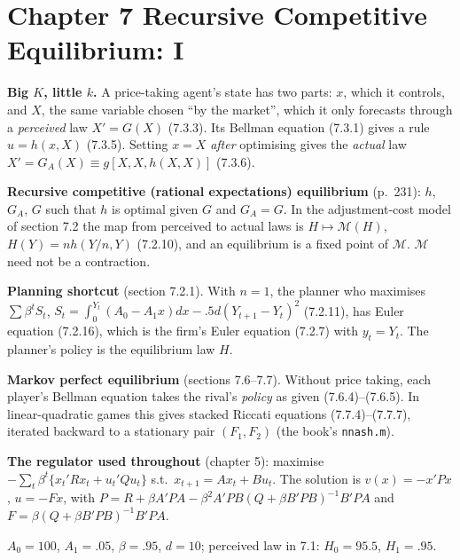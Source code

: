 \documentclass[12pt, letterpaper]{article}
\begin{document}
\tableofcontents
\newpage

\section{Chapter 7 \quad Recursive Competitive Equilibrium: I}

\begin{tcolorbox}[theorybox,title={Chapter 7 Overview}]
\textbf{Big $K$, little $k$.} A price-taking agent's state has two parts: $x$, which it controls,
and $X$, the same variable chosen ``by the market'', which it only forecasts through a
\emph{perceived} law $X'=G(X)$ (7.3.3). Its Bellman equation (7.3.1) gives a rule $u=h(x,X)$
(7.3.5). Setting $x=X$ \emph{after} optimising gives the \emph{actual} law
$X'=G_A(X)\equiv g[X,X,h(X,X)]$ (7.3.6).

\textbf{Recursive competitive (rational expectations) equilibrium} (p.~231): $h$, $G_A$, $G$ such that
$h$ is optimal given $G$ and $G_A=G$. In the adjustment-cost model of section 7.2 the map from
perceived to actual laws is $H\mapsto\mathcal M(H)$, $H(Y)=nh(Y/n,Y)$ (7.2.10), and an equilibrium is
a fixed point of $\mathcal M$. $\mathcal M$ need not be a contraction.

\textbf{Planning shortcut} (section 7.2.1). With $n=1$, the planner who maximises
$\sum\beta^tS_t$, $S_t=\int_0^{Y_t}(A_0-A_1x)dx-.5d(Y_{t+1}-Y_t)^2$ (7.2.11), has Euler equation
(7.2.16), which is the firm's Euler equation (7.2.7) with $y_t=Y_t$. The planner's policy is the
equilibrium law $H$.

\textbf{Markov perfect equilibrium} (sections 7.6--7.7). Without price taking, each player's
Bellman equation takes the rival's \emph{policy} as given (7.6.4)--(7.6.5). In linear-quadratic
games this gives stacked Riccati equations (7.7.4)--(7.7.7), iterated backward to a stationary pair
$(F_1,F_2)$ (the book's \texttt{nnash.m}).

\textbf{The regulator used throughout} (chapter 5): maximise $-\sum_t\beta^t\{x_t'Rx_t+u_t'Qu_t\}$ s.t.\
$x_{t+1}=Ax_t+Bu_t$. The solution is $v(x)=-x'Px$, $u=-Fx$, with
$P=R+\beta A'PA-\beta^2A'PB(Q+\beta B'PB)^{-1}B'PA$ and $F=\beta(Q+\beta B'PB)^{-1}B'PA$.
\end{tcolorbox}

\begin{tcolorbox}[databox,title={Parameter values used in 7.1--7.5 (given in Exercise 7.1(c))}]
$A_0=100$, $A_1=.05$, $\beta=.95$, $d=10$; perceived law in 7.1: $H_0=95.5$, $H_1=.95$.
\end{tcolorbox}
\end{document}
